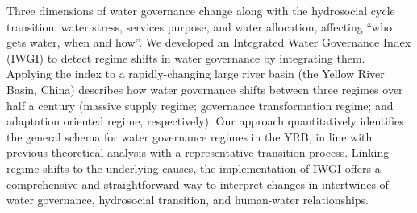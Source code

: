
Three dimensions of water governance change along with the hydrosocial cycle transition: water stress, services purpose, and water allocation, affecting ``who gets water, when and how''. We developed an Integrated Water Governance Index (IWGI) to detect regime shifts in water governance by integrating them. Applying the index to a rapidly-changing large river basin (the Yellow River Basin, China) describes how water governance shifts between three regimes over half a century (massive supply regime; governance transformation regime; and adaptation oriented regime, respectively). Our approach quantitatively identifies the general schema for water governance regimes in the YRB, in line with previous theoretical analysis with a representative transition process. Linking regime shifts to the underlying causes, the implementation of IWGI offers a comprehensive and straightforward way to interpret changes in intertwines of water governance, hydrosocial transition, and human-water relationships.
